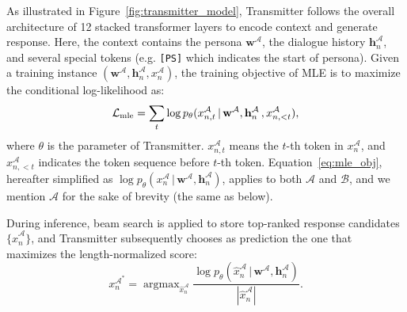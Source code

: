 \documentclass[11pt,a4paper]{article}
\begin{document}
As illustrated in Figure~\ref{fig:transmitter_model}, Transmitter follows the overall architecture of 12 stacked transformer layers to encode context and generate response. Here, the context contains the persona $\mathbf{w}^{\mathcal{A}}$, the dialogue history $\mathbf{h}^{\mathcal{A}}_n$, and several special tokens (e.g. \texttt{[PS]} which indicates the start of persona). Given a training instance $(\mathbf{w}^{\mathcal{A}},\mathbf{h}^{\mathcal{A}}_n, x^{\mathcal{A}}_n)$, the training objective of MLE is to maximize the conditional log-likelihood as:
\begin{equation}\label{eq:mle_obj}
    \mathcal{L}_{\rm{mle}} = \sum_{t} \log p_{\theta}(x^\mathcal{A}_{n,t}\,|\,\mathbf{w}^{\mathcal{A}},\mathbf{h}^{\mathcal{A}}_n\,,x^\mathcal{A}_{n,<t}),
\end{equation}
where $\theta$ is the parameter of Transmitter. $x^\mathcal{A}_{n,t}$ means the $t$-th token in $x^\mathcal{A}_n$, and $x^\mathcal{A}_{n,<t}$ indicates the token sequence before $t$-th token. Equation~\ref{eq:mle_obj}, hereafter simplified as $\log p_{\theta}(x^\mathcal{A}_n\,|\,\mathbf{w}^{\mathcal{A}},\mathbf{h}^{\mathcal{A}}_n)$, applies to both $\mathcal{A}$ and $\mathcal{B}$, and we mention $\mathcal{A}$ for the sake of brevity (the same as below).

During inference, beam search is applied to store top-ranked response candidates $\{\hat{x}^{\mathcal{A}}_n\}$, and Transmitter subsequently chooses as prediction the one that maximizes the length-normalized score:
\begin{equation}\label{eq:max_response}
    x^{\mathcal{A}^*}_{n} = \mathop{\arg\max}_{\hat{x}^{\mathcal{A}}_{n}} \frac{\log p_{\theta}(\hat{x}^{\mathcal{A}}_n\,|\,\mathbf{w}^{\mathcal{A}},\mathbf{h}^{\mathcal{A}}_n)}{|\hat{x}^{\mathcal{A}}_n|}.
\end{equation}
\end{document}
